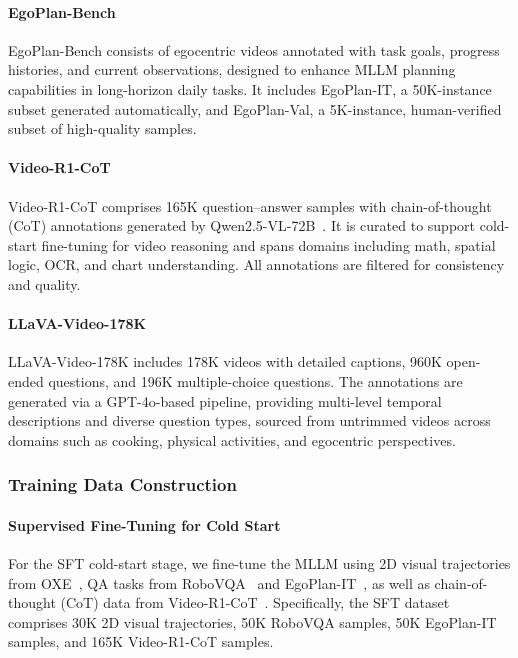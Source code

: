 \paragraph{EgoPlan-Bench~\cite{chen2023egoplan}} EgoPlan-Bench consists of egocentric videos annotated with task goals, progress histories, and current observations, designed to enhance MLLM planning capabilities in long-horizon daily tasks. It includes EgoPlan-IT, a 50K-instance subset generated automatically, and EgoPlan-Val, a 5K-instance, human-verified subset of high-quality samples.

\paragraph{Video-R1-CoT~\cite{feng2025video}} Video-R1-CoT comprises 165K question–answer samples with chain-of-thought (CoT) annotations generated by Qwen2.5-VL-72B~\cite{bai2025qwen2}. It is curated to support cold-start fine-tuning for video reasoning and spans domains including math, spatial logic, OCR, and chart understanding. All annotations are filtered for consistency and quality.

\paragraph{LLaVA-Video-178K~\cite{zhang2024video}} LLaVA-Video-178K includes 178K videos with detailed captions, 960K open-ended questions, and 196K multiple-choice questions. The annotations are generated via a GPT-4o-based pipeline, providing multi-level temporal descriptions and diverse question types, sourced from untrimmed videos across domains such as cooking, physical activities, and egocentric perspectives.



\subsubsection{Training Data Construction}
\paragraph{Supervised Fine-Tuning for Cold Start} For the SFT cold-start stage, we fine-tune the MLLM using 2D visual trajectories from OXE~\cite{o2024open}, QA tasks from RoboVQA~\cite{sermanet2024robovqa} and EgoPlan-IT~\cite{chen2023egoplan}, as well as chain-of-thought (CoT) data from Video-R1-CoT~\cite{feng2025video}. Specifically, the SFT dataset comprises 30K 2D visual trajectories, 50K RoboVQA samples, 50K EgoPlan-IT samples, and 165K Video-R1-CoT samples.

